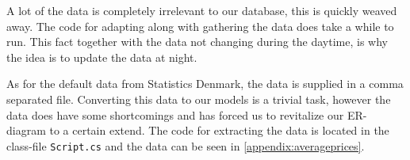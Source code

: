 A lot of the data is completely irrelevant to our database, this is quickly weaved away. The code for adapting along with gathering the data does take a while to run. This fact together with the data not changing during the daytime, is why the idea is to update the data at night.

As for the default data from Statistics Denmark, the data is supplied in a comma separated file. Converting this data to our models is a trivial task, however the data does have some shortcomings and has forced us to revitalize our ER-diagram to a certain extend. The code for extracting the data is located in the class-file \texttt{Script.cs} and the data can be seen in \ref{appendix:averageprices}.
